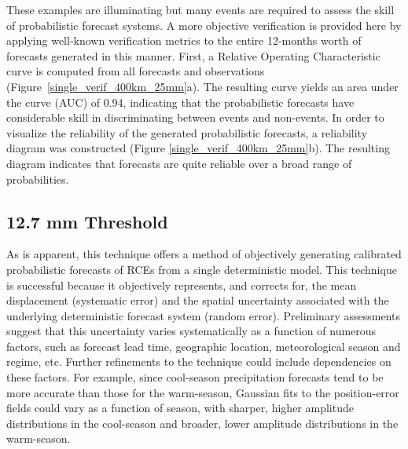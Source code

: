 These examples are illuminating but many events are required to assess the skill of probabilistic forecast systems.
A more objective verification is provided here by applying well-known verification metrics to the entire 12-months worth of forecasts generated in this manner.
First, a Relative Operating Characteristic curve \citep{Mason1982} is computed from all forecasts and observations \mbox{(Figure \ref{single_verif_400km_25mm}a)}.
The resulting curve yields an area under the curve (AUC) of 0.94, indicating that the probabilistic forecasts have considerable skill in discriminating between events and non-events.
In order to visualize the reliability of the generated probabilistic forecasts, a reliability diagram was constructed (Figure \mbox{\ref{single_verif_400km_25mm}b)}.
The resulting diagram indicates that forecasts are quite reliable over a broad range of probabilities.




\subsection{12.7 mm Threshold}
\label{dresults_12.7mm}





As is apparent, this technique offers a method of objectively generating calibrated probabilistic forecasts of RCEs from a single deterministic model.
This technique is successful because it objectively represents, and corrects for, the mean displacement (systematic error) and the spatial uncertainty associated with the underlying deterministic forecast system (random error).
Preliminary assessments suggest that this uncertainty varies systematically as a function of numerous factors, such as forecast lead time, geographic location, meteorological season and regime, etc.
Further refinements to the technique could include dependencies on these factors.
For example, since cool-season precipitation forecasts tend to be more accurate than those for the warm-season, Gaussian fits to the position-error fields could vary as a function of season, with sharper, higher amplitude distributions in the cool-season and broader, lower amplitude distributions in the warm-season.



